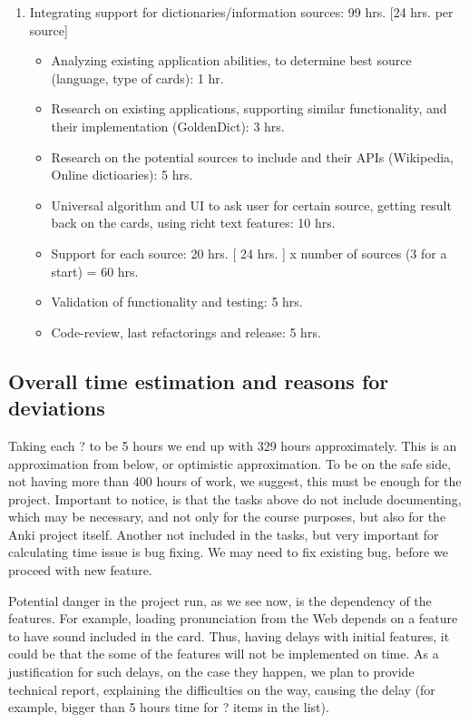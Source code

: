 \documentclass[a4paper,11pt,twoside]{article}
\begin{document}
\begin{enumerate}
  
\item Integrating support for dictionaries/information sources: 99 hrs. [24 hrs. per source]
  \begin{itemize}
   \item Analyzing existing application abilities, to determine best source (language, type of cards): 1 hr.
   \item Research on existing applications, supporting similar functionality, and their implementation (GoldenDict): 3 hrs.
   \item Research on the potential sources to include and their APIs (Wikipedia, Online dictioaries): 5 hrs.
   \item Universal algorithm and UI to ask user for certain source, getting result back on the cards, using richt text features: 10 hrs.
   \item Support for each source: 20 hrs. [ 24 hrs. ] x number of sources (3 for a start) = 60 hrs.
   \item Validation of functionality and testing: 5 hrs.
   \item Code-review, last refactorings and release: 5 hrs.   
  \end{itemize}
\end{enumerate}

\subsection{Overall time estimation and reasons for deviations}

Taking each ? to be 5 hours we end up with 329 hours approximately. This is an approximation from below, or optimistic 
approximation. To be on the safe side, not having more than 400 hours of work, we suggest, this must be enough for the project.
Important to notice, is that the tasks above do not include documenting, which may be necessary, and not only for the course 
purposes, but also for the Anki project itself. Another not included in the tasks, but very important for calculating time issue
is bug fixing. We may need to fix existing bug, before we proceed with new feature.

Potential danger in the project run, as we see now, is the dependency of the features. For example, loading pronunciation from
the Web depends on a feature to have sound included in the card. Thus, having delays with initial features, it could be
that the some of the features will not be implemented on time. As a justification for such delays, on the case they happen,
we plan to provide technical report, explaining the difficulties on the way, causing the delay (for example, bigger than 5 hours
time for ? items in the list).
\end{document}

